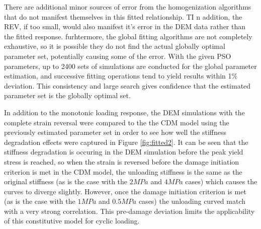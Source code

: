 There are additional minor sources of error from the homogenization algorithms that do not manifest themselves in this fitted relationship.  TI n addition, the REV, if too small, would also manifest it's error in the DEM data rather than the fitted response. furhtermore, the global fitting algorithms are not completely exhaustive, so it is possible they do not find the actual globally optimal parameter set, potentially causing some of the error. With the given PSO parameters, up to 2400 sets of simulations are conducted for the global parameter estimation, and successive fitting operations tend to yield results within 1\% deviation. This consistency and large search gives confidence that the estimated parameter set is the globally optimal set. 

In addition to the monotonic loading response, the DEM simulations with the complete strain reversal were compared to the the CDM model using the previously estimated parameter set in order to see how well the stiffness degradation effects were captured in Figure \ref{fig:fitted2}. It can be seen that the stiffness degradation is occuring in the DEM simulation before the peak yield stress is reached, so when the strain is reversed  before the damage initiation criterion is met in the CDM model, the unloading stiffness is the same as the original stiffness (as is the case with the $2MPa$ and $4MPa$ cases) which causes the curves to diverge slightly. However, once the damage initiation criterion is met (as is the case with the $1MPa$ and $0.5MPa$ cases) the unloading curved match with a very strong correlation. This pre-damage deviation limits the applicability of this constitutive model for cyclic loading.
